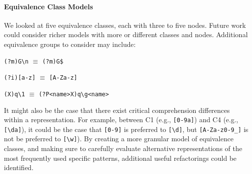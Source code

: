 \paragraph{Equivalence Class Models}
We looked at five equivalence classes, each with three to five nodes.  
Future work could consider richer models with more or different classes and nodes.  
%
Additional equivalence groups to consider may include: 
\begin{description} \itemsep -2pt
\item[Multi line option]  \verb!(?m)G\n! $\equiv$ \verb!(?m)G$!
\item[Case insensitive]  \verb!(?i)[a-z]! $\equiv$ \verb![A-Za-z]!
\item[Backreferences]  \verb!(X)q\1! $\equiv$ \verb!(?P<name>X)q\g<name>!
\end{description}



It might also be the case that there exist critical comprehension differences within a representation. For example, between C1 (e.g., \verb![0-9a]!) and C4 (e.g., \verb![\da]!), it could be the case that \verb![0-9]! is preferred to \verb![\d]!, but \verb![A-Za-z0-9_]! is not be preferred to \verb![\w]!).
By creating a more granular model of equivalence classes, and making sure to carefully evaluate alternative representations of the most frequently used specific patterns,  additional useful refactorings could be identified.



